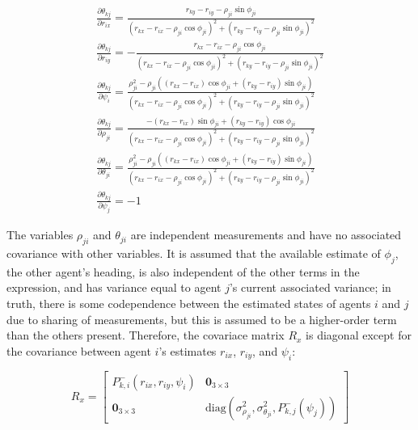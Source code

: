 \documentclass{aiaa-tc}
\newcommand{\B}[1]{\textbf{#1}} %
\begin{document}
\begin{align}
\frac{ \partial \theta_{kj} }{ \partial r_{ix} } = 
\frac{ r_{ky}-r_{iy} - \rho_{ji}\sin{\phi_{ji}} }{ (r_{kx}-r_{ix} - \rho_{ji}\cos{\phi_{ji}})^2 + (r_{ky}-r_{iy} - \rho_{ji}\sin{\phi_{ji}})^2 } \\
\frac{ \partial \theta_{kj} }{ \partial r_{iy} } = 
-\frac{ r_{kx}-r_{ix} - \rho_{ji}\cos{\phi_{ji}} }{ (r_{kx}-r_{ix} - \rho_{ji}\cos{\phi_{ji}})^2 + (r_{ky}-r_{iy} - \rho_{ji}\sin{\phi_{ji}})^2 } \\
\frac{ \partial \theta_{kj} }{ \partial \psi_{i} } = 
\frac{ \rho_{ji}^2 - \rho_{ji}((r_{kx}-r_{ix})\cos{\phi_{ji}}+(r_{ky}-r_{iy})\sin{\phi_{ji}}) }{ (r_{kx}-r_{ix} - \rho_{ji}\cos{\phi_{ji}})^2 + (r_{ky}-r_{iy} - \rho_{ji}\sin{\phi_{ji}})^2 } \\
\frac{ \partial \theta_{kj} }{ \partial \rho_{ji} } = 
\frac{ -(r_{kx}-r_{ix})\sin{\phi_{ji}} + (r_{ky}-r_{iy})\cos{\phi_{ji}} }{ (r_{kx}-r_{ix} - \rho_{ji}\cos{\phi_{ji}})^2 + (r_{ky}-r_{iy} - \rho_{ji}\sin{\phi_{ji}})^2 } \\
\frac{ \partial \theta_{kj} }{ \partial \theta_{ji} } = 
\frac{ \rho_{ji}^2 - \rho_{ji}((r_{kx}-r_{ix})\cos{\phi_{ji}}+(r_{ky}-r_{iy})\sin{\phi_{ji}}) }{ (r_{kx}-r_{ix} - \rho_{ji}\cos{\phi_{ji}})^2 + (r_{ky}-r_{iy} - \rho_{ji}\sin{\phi_{ji}})^2 } \\
\frac{ \partial \theta_{kj} }{ \partial \psi_{j} } = -1
\end{align}

The variables $\rho_{ji}$ and $\theta_{ji}$ are independent measurements and have no associated covariance with other variables. It is assumed that the available estimate of $\phi_j$, the other agent's heading, is also independent of the other terms in the expression, and has variance equal to agent $j$'s current associated variance; in truth, there is some codependence between the estimated states of agents $i$ and $j$ due to sharing of measurements, but this is assumed to be a higher-order term than the others present. Therefore, the covariace matrix $R_x$ is diagonal except for the covariance between agent $i$'s estimates $r_{ix}$, $r_{iy}$, and $\psi_i$:

\begin{equation}
R_x = \begin{bmatrix}
P_{k,i}^{-}(r_{ix},r_{iy},\psi_i) & \B{0}_{3\times 3} \\
\B{0}_{3\times 3} & \mathrm{diag}(\sigma_{\rho_{ji}}^2,\sigma_{\theta_{ji}}^2,P_{k,j}^{-}(\psi_j) )
\end{bmatrix}
\end{equation}
\end{document}
